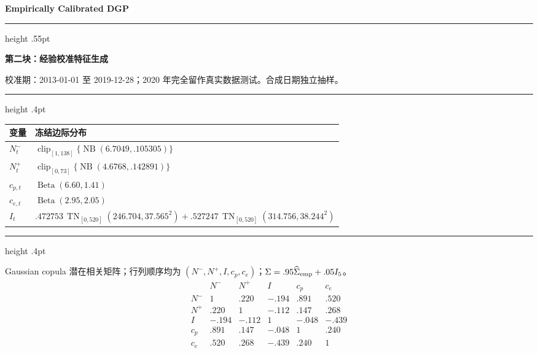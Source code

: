 \documentclass[a4paper,fontset=none]{ctexart}
\renewcommand{\arraystretch}{1.17}
\newcommand{\pagetitle}[1]{%
  \begin{center}
    {\fontsize{19}{22}\selectfont\bfseries Empirically Calibrated DGP}\par
  \end{center}
  \vspace{4pt}
  \color{rule}\hrule height .55pt\color{ink}
  \vspace{5pt}
  \noindent\colorbox{soft}{%
    \parbox{\dimexpr\linewidth-2\fboxsep\relax}{%
      \fontsize{13}{15}\selectfont\bfseries #1}}
  \vspace{5pt}}
\newcommand{\group}[1]{%
  \vspace{4pt}{\fontsize{11}{13}\selectfont\bfseries #1}\par
  \vspace{1pt}\color{rule}\hrule height .4pt\color{ink}\vspace{3pt}}
\newcommand{\smallnote}[1]{%
  {\fontsize{8.5}{10}\selectfont\color{muted}#1}}
\newcommand{\TN}{\operatorname{TN}}
\newcommand{\NB}{\operatorname{NB}}
\newcommand{\Beta}{\operatorname{Beta}}
\begin{document}
\newpage

\pagetitle{第二块：经验校准特征生成}

\begingroup
\fontsize{8.8}{10.4}\selectfont
\renewcommand{\arraystretch}{1.06}
\setlength{\abovedisplayskip}{1.5pt}
\setlength{\belowdisplayskip}{1.5pt}
\setlength{\abovedisplayshortskip}{1pt}
\setlength{\belowdisplayshortskip}{1pt}
\renewcommand{\group}[1]{%
  \vspace{2pt}{\fontsize{10.8}{12.5}\selectfont\bfseries #1}\par
  \vspace{.5pt}\color{rule}\hrule height .4pt\color{ink}\vspace{1.5pt}}

\smallnote{校准期：2013-01-01 至 2019-12-28；2020 年完全留作真实数据测试。合成日期独立抽样。}

\group{日级边际分布}
\begin{center}
\fontsize{9.1}{11}\selectfont
\begin{tabularx}{.96\textwidth}{
  >{\bfseries}p{22mm}
  X}
\toprule
变量 & 冻结边际分布\\
\midrule
$N_t^-$ & $\operatorname{clip}_{[1,138]}\{\NB(6.7049,.105305)\}$\\
$N_t^+$ & $\operatorname{clip}_{[0,73]}\{\NB(4.6768,.142891)\}$\\
$c_{p,t}$ & $\Beta(6.60,1.41)$\\
$c_{e,t}$ & $\Beta(2.95,2.05)$\\
$I_t$ & $.472753\,\TN_{[0,520]}(246.704,37.565^2)
+.527247\,\TN_{[0,520]}(314.756,38.244^2)$\\
\bottomrule
\end{tabularx}
\end{center}

\group{日级经验相关}
\begin{center}
\smallnote{Gaussian copula 潜在相关矩阵；行列顺序均为 $(N^-,N^+,I,c_p,c_e)$；$\Sigma=.95\widehat\Sigma_{\rm emp}+.05I_5$。}
\[
\begin{array}{c|rrrrr}
 &N^-&N^+&I&c_p&c_e\\ \hline
N^-&1& .220&-.194& .891& .520\\
N^+&.220&1&-.112& .147& .268\\
I&-.194&-.112&1&-.048&-.439\\
c_p&.891& .147&-.048&1& .240\\
c_e&.520& .268&-.439& .240&1
\end{array}
\]
\end{center}
\end{document}
